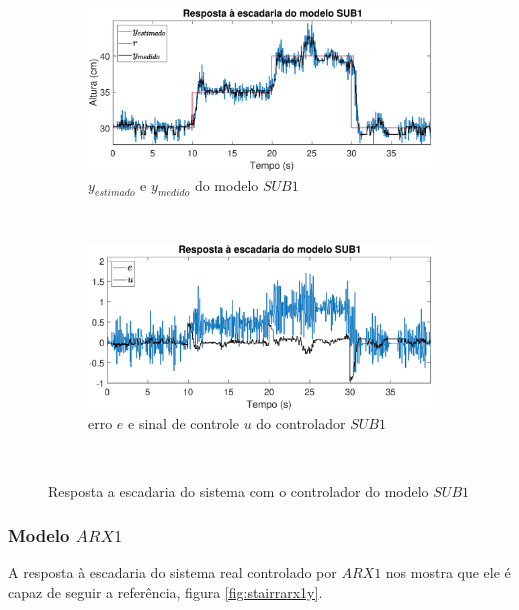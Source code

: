 \begin{figure}[htb]
	\centering
	\begin{subfigure}[t]{0.48\textwidth}
		\includegraphics[width=1\linewidth]{stairrsub1y}
		\caption[$y_{estimado}$ e $y_{medido}$ do modelo $SUB1$]{$y_{estimado}$ e $y_{medido}$ do modelo $SUB1$}
		\label{fig:stairrsub1y}
	\end{subfigure}
	~ %
	\begin{subfigure}[t]{0.48\textwidth}
		\includegraphics[width=1\linewidth]{stairrsub1e}
		\caption[erro $e$ e sinal de controle $u$ do controlador $SUB1$]{erro $e$ e sinal de controle $u$ do controlador $SUB1$}
		\label{fig:stairrsub1e}
	\end{subfigure}
	~ %
	
	\caption{Resposta a escadaria do sistema com o controlador do modelo $SUB1$}\label{fig:stairrsub1}
\end{figure}

\subsubsection{Modelo $ARX1$}
A resposta à escadaria do sistema real controlado por $ARX1$ nos mostra que ele é capaz de seguir a referência, figura \ref{fig:stairrarx1y}.

